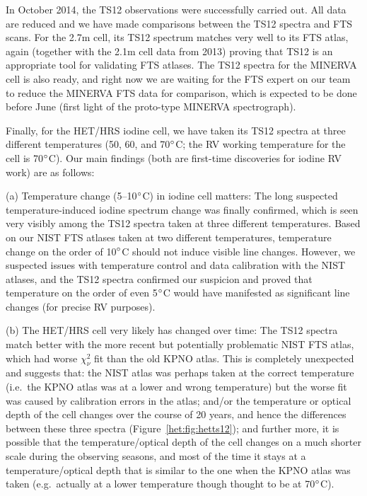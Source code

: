 In October 2014, the TS12 observations were successfully carried
out. All data are reduced and we have made comparisons between the
TS12 spectra and FTS scans. For the 2.7m cell, its TS12 spectrum
matches very well to its FTS atlas, again (together with the 2.1m cell
data from 2013) proving that TS12 is an appropriate tool for
validating FTS atlases. The TS12 spectra for the MINERVA cell is also
ready, and right now we are waiting for the FTS expert on our team to
reduce the MINERVA FTS data for comparison, which is expected to be
done before June (first light of the proto-type MINERVA spectrograph).

Finally, for the HET/HRS iodine cell, we have taken its TS12 spectra
at three different temperatures (50, 60, and 70$^{\circ}$C; the RV
working temperature for the cell is 70$^{\circ}$C). Our main findings
(both are first-time discoveries for iodine RV work) are as follows:

(a) Temperature change (5--10$^{\circ}$C) in iodine cell matters: The
long suspected temperature-induced iodine spectrum change was finally
confirmed, which is seen very visibly among the TS12 spectra taken at
three different temperatures. Based on our NIST FTS atlases taken at
two different temperatures, temperature change on the order of
10$^{\circ}$C should not induce visible line changes. However, we
suspected issues with temperature control and data calibration with
the NIST atlases, and the TS12 spectra confirmed our suspicion and
proved that temperature on the order of even 5$^{\circ}$C would have
manifested as significant line changes (for precise RV purposes).

(b) The HET/HRS cell very likely has changed over time: The TS12
spectra match better with the more recent but potentially problematic
NIST FTS atlas, which had worse $\chi^2_\nu$ fit than the old KPNO
atlas. This is completely unexpected and suggests that: the NIST atlas
was perhaps taken at the correct temperature (i.e.\ the KPNO atlas was
at a lower and wrong temperature) but the worse fit was caused by
calibration errors in the atlas; and/or the temperature or optical
depth of the cell changes over the course of 20 years, and hence the
differences between these three spectra (Figure~\ref{het:fig:hetts12}); and
further more, it is possible that the temperature/optical depth of the
cell changes on a much shorter scale during the observing seasons, and
most of the time it stays at a temperature/optical depth that is
similar to the one when the KPNO atlas was taken (e.g.\ actually at a
lower temperature though thought to be at 70$^{\circ}$C).



